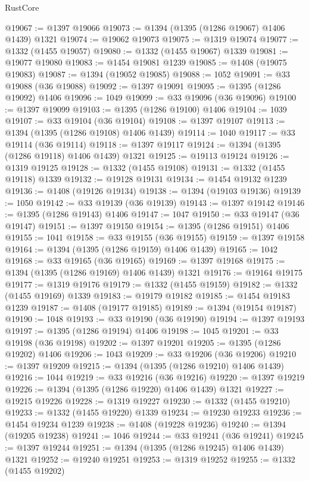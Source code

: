 \begin{lexlean}{RustCore}
\begin{coremodule}
@19067 := @1397 @19066
@19073 := @1394 (@1395 (@1286 @19067) @1406 @1439) @1321
@19074 := @19062 @19073
@19075 := @1319 @19074
@19077 := @1332 (@1455 @19057)
@19080 := @1332 (@1455 @19067) @1339
@19081 := @19077 @19080
@19083 := @1454 @19081 @1239
@19085 := @1408 (@19075 @19083)
@19087 := @1394 (@19052 @19085)
@19088 := 1052
@19091 := @33 @19088 (@36 @19088)
@19092 := @1397 @19091
@19095 := @1395 (@1286 @19092) @1406
@19096 := 1049
@19099 := @33 @19096 (@36 @19096)
@19100 := @1397 @19099
@19103 := @1395 (@1286 @19100) @1406
@19104 := 1039
@19107 := @33 @19104 (@36 @19104)
@19108 := @1397 @19107
@19113 := @1394 (@1395 (@1286 @19108) @1406 @1439)
@19114 := 1040
@19117 := @33 @19114 (@36 @19114)
@19118 := @1397 @19117
@19124 := @1394 (@1395 (@1286 @19118) @1406 @1439) @1321
@19125 := @19113 @19124
@19126 := @1319 @19125
@19128 := @1332 (@1455 @19108)
@19131 := @1332 (@1455 @19118) @1339
@19132 := @19128 @19131
@19134 := @1454 @19132 @1239
@19136 := @1408 (@19126 @19134)
@19138 := @1394 (@19103 @19136)
@19139 := 1050
@19142 := @33 @19139 (@36 @19139)
@19143 := @1397 @19142
@19146 := @1395 (@1286 @19143) @1406
@19147 := 1047
@19150 := @33 @19147 (@36 @19147)
@19151 := @1397 @19150
@19154 := @1395 (@1286 @19151) @1406
@19155 := 1041
@19158 := @33 @19155 (@36 @19155)
@19159 := @1397 @19158
@19164 := @1394 (@1395 (@1286 @19159) @1406 @1439)
@19165 := 1042
@19168 := @33 @19165 (@36 @19165)
@19169 := @1397 @19168
@19175 := @1394 (@1395 (@1286 @19169) @1406 @1439) @1321
@19176 := @19164 @19175
@19177 := @1319 @19176
@19179 := @1332 (@1455 @19159)
@19182 := @1332 (@1455 @19169) @1339
@19183 := @19179 @19182
@19185 := @1454 @19183 @1239
@19187 := @1408 (@19177 @19185)
@19189 := @1394 (@19154 @19187)
@19190 := 1048
@19193 := @33 @19190 (@36 @19190)
@19194 := @1397 @19193
@19197 := @1395 (@1286 @19194) @1406
@19198 := 1045
@19201 := @33 @19198 (@36 @19198)
@19202 := @1397 @19201
@19205 := @1395 (@1286 @19202) @1406
@19206 := 1043
@19209 := @33 @19206 (@36 @19206)
@19210 := @1397 @19209
@19215 := @1394 (@1395 (@1286 @19210) @1406 @1439)
@19216 := 1044
@19219 := @33 @19216 (@36 @19216)
@19220 := @1397 @19219
@19226 := @1394 (@1395 (@1286 @19220) @1406 @1439) @1321
@19227 := @19215 @19226
@19228 := @1319 @19227
@19230 := @1332 (@1455 @19210)
@19233 := @1332 (@1455 @19220) @1339
@19234 := @19230 @19233
@19236 := @1454 @19234 @1239
@19238 := @1408 (@19228 @19236)
@19240 := @1394 (@19205 @19238)
@19241 := 1046
@19244 := @33 @19241 (@36 @19241)
@19245 := @1397 @19244
@19251 := @1394 (@1395 (@1286 @19245) @1406 @1439) @1321
@19252 := @19240 @19251
@19253 := @1319 @19252
@19255 := @1332 (@1455 @19202)

\end{coremodule}
\end{lexlean}

